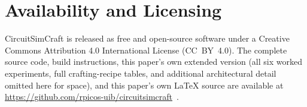 \section*{Availability and Licensing}
\label{sec:availability}

CircuitSimCraft is released as free and open-source software under a Creative Commons
Attribution 4.0 International License (CC~BY~4.0). The
complete source code, build instructions, this paper's own extended version (all six worked
experiments, full crafting-recipe tables, and additional architectural detail omitted here
for space), and this paper's own \LaTeX{} source are available at
\url{https://github.com/rpicos-uib/circuitsimcraft}~\cite{picos2026circuitsimcraft}.